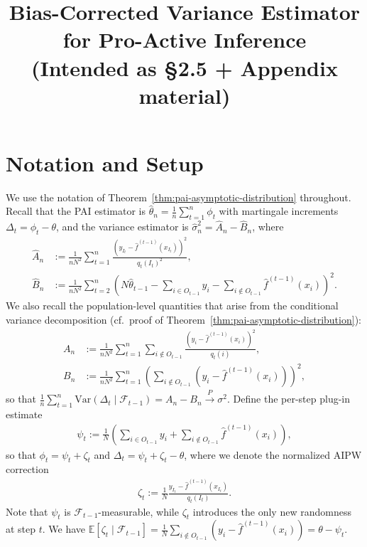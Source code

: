 \documentclass[11pt]{article}
\title{Bias-Corrected Variance Estimator for Pro-Active Inference\\[4pt]
\large (Intended as \S2.5 + Appendix material)}
\author{}
\date{}
\newcommand{\thetahat}{\hat{\theta}}
\newcommand{\fhat}{\hat{f}}
\newcommand{\sigmahat}{\hat{\sigma}}
\newcommand{\Bhat}{\hat{B}}
\newcommand{\Ahat}{\hat{A}}
\newcommand{\F}{\mathcal{F}}
\newcommand{\Var}{\mathrm{Var}}
\newcommand{\toP}{\xrightarrow{P}}
\begin{document}
\maketitle


\section*{Notation and Setup}

We use the notation of Theorem~\ref{thm:pai-asymptotic-distribution} throughout. Recall that
the PAI estimator is $\thetahat_n = \frac{1}{n}\sum_{t=1}^n \phi_t$ with martingale increments $\Delta_t = \phi_t - \theta$, and the variance estimator is $\sigmahat_n^2 = \Ahat_n - \Bhat_n$, where
\begin{align*}
    \Ahat_n &:= \frac{1}{nN^2} \sum_{t=1}^n \frac{\left( y_{I_t} - \fhat^{(t-1)}(x_{I_t}) \right)^2}{q_t(I_t)^2}, \\
    \Bhat_n &:= \frac{1}{nN^2} \sum_{t=2}^n \left( N\thetahat_{t-1} - \sum_{i \in O_{t-1}} y_i - \sum_{i \notin O_{t-1}} \fhat^{(t-1)}(x_i) \right)^2.
\end{align*}
We also recall the population-level quantities that arise from the conditional variance decomposition (cf.~proof of Theorem~\ref{thm:pai-asymptotic-distribution}):
\begin{align*}
    A_n &:= \frac{1}{nN^2} \sum_{t=1}^n \sum_{i \notin O_{t-1}} \frac{\left( y_i - \fhat^{(t-1)}(x_i) \right)^2}{q_t(i)}, \\
    B_n &:= \frac{1}{nN^2} \sum_{t=1}^n \left( \sum_{i \notin O_{t-1}} \left( y_i - \fhat^{(t-1)}(x_i) \right) \right)^2,
\end{align*}
so that $\frac{1}{n}\sum_{t=1}^n \Var(\Delta_t \mid \F_{t-1}) = A_n - B_n \toP \sigma^2$. Define the per-step plug-in estimate
\begin{align}
\label{eq:psi_def}
    \psi_t := \frac{1}{N}\left( \sum_{i \in O_{t-1}} y_i + \sum_{i \notin O_{t-1}} \fhat^{(t-1)}(x_i) \right),
\end{align}
so that $\phi_t = \psi_t + \zeta_t$ and $\Delta_t = \psi_t + \zeta_t - \theta$, where we denote the normalized AIPW correction
\begin{align}
\label{eq:zeta_def}
    \zeta_t := \frac{1}{N}\frac{y_{I_t} - \fhat^{(t-1)}(x_{I_t})}{q_t(I_t)}.
\end{align}
Note that $\psi_t$ is $\F_{t-1}$-measurable, while $\zeta_t$ introduces the only new randomness at step $t$. We have $\mathbb{E}[\zeta_t \mid \F_{t-1}] = \frac{1}{N}\sum_{i \notin O_{t-1}}(y_i - \fhat^{(t-1)}(x_i)) = \theta - \psi_t$.
\end{document}
